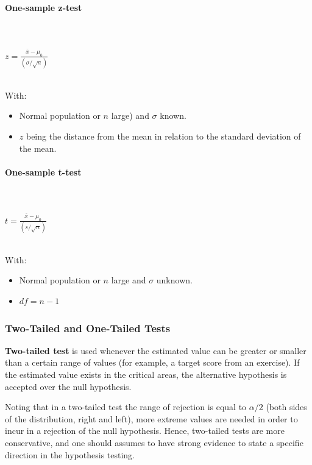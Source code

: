 \documentclass{article}
\begin{document}
\paragraph{One-sample z-test}\mbox{} \\
\mbox{} \\

$ \displaystyle z={\frac {{\overline {x}}-\mu _{0}}{({\sigma }/{\sqrt {n}})}} $

\mbox{} \\

With:
\begin{itemize}
    \item Normal population or $n$ large) and $\sigma$ known.
    \item $z$ being the distance from the mean in relation to the standard deviation of the mean.
\end{itemize}

\paragraph{One-sample t-test}\mbox{} \\
\mbox{} \\

$ t=\frac{\overline{x}-\mu_0} {( s / \sqrt{n} )} $ 

\mbox{} \\

With:
\begin{itemize}
    \item Normal population or $n$ large and $\sigma$ unknown.
    \item $df = n-1$
\end{itemize}

\subsubsection{Two-Tailed and One-Tailed Tests}
\textbf{Two-tailed test} is used whenever the estimated value can be greater or smaller than a certain range of values (for example, a target score from an exercise). 
If the estimated value exists in the critical areas, the alternative hypothesis is accepted over the null hypothesis. 

Noting that in a two-tailed test the range of rejection is equal to $\alpha/2$  (both sides of the distribution, right and left), more extreme values are needed in order to incur in a rejection of the null hypothesis. Hence, two-tailed tests are more conservative, and one should assumes to have strong evidence to state a specific direction in the hypothesis testing.
\end{document}
